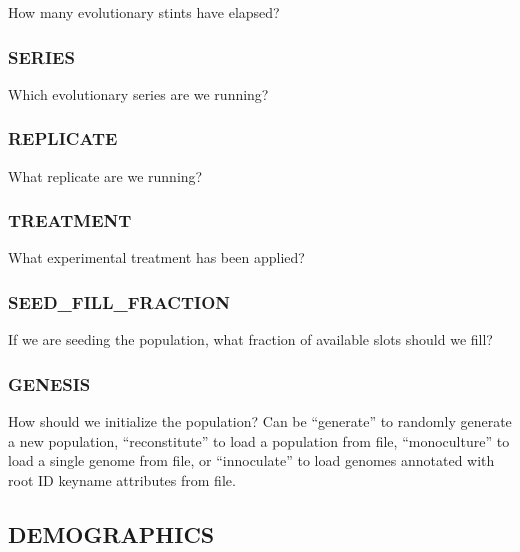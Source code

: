How many evolutionary stints have elapsed?

\subsubsection{SERIES}


Which evolutionary series are we running?

\subsubsection{REPLICATE}


What replicate are we running?

\subsubsection{TREATMENT}


What experimental treatment has been applied?

\subsubsection{SEED\_FILL\_FRACTION}


If we are seeding the population, what fraction of available slots should we fill?

\subsubsection{GENESIS}


How should we initialize the population?
Can be ``generate'' to randomly generate a new population,  ``reconstitute'' to load a population from file, ``monoculture'' to load a single genome from file, or ``innoculate'' to load genomes annotated with root ID keyname attributes from file.


\subsection{DEMOGRAPHICS}


